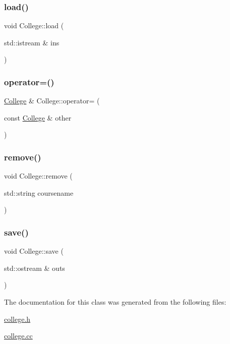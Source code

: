 \hypertarget{class_college_a11422094ddd907705daede7aa537dd73}{}\label{class_college_a11422094ddd907705daede7aa537dd73} 
\subsubsection{\texorpdfstring{load()}{load()}}
{\footnotesize\ttfamily void College\+::load (\begin{DoxyParamCaption}\item[{std\+::istream \&}]{ins }\end{DoxyParamCaption})}

\hypertarget{class_college_af2194c9b37f80d13dc3fdba6784b18e8}{}\label{class_college_af2194c9b37f80d13dc3fdba6784b18e8} 
\subsubsection{\texorpdfstring{operator=()}{operator=()}}
{\footnotesize\ttfamily \hyperlink{class_college}{College} \& College\+::operator= (\begin{DoxyParamCaption}\item[{const \hyperlink{class_college}{College} \&}]{other }\end{DoxyParamCaption})}

\hypertarget{class_college_a4d2ae513b36e6421fb1ca2c08459cfe6}{}\label{class_college_a4d2ae513b36e6421fb1ca2c08459cfe6} 
\subsubsection{\texorpdfstring{remove()}{remove()}}
{\footnotesize\ttfamily void College\+::remove (\begin{DoxyParamCaption}\item[{std\+::string}]{coursename }\end{DoxyParamCaption})}

\hypertarget{class_college_af6b419f813bc990c0e11f99b78a26899}{}\label{class_college_af6b419f813bc990c0e11f99b78a26899} 
\subsubsection{\texorpdfstring{save()}{save()}}
{\footnotesize\ttfamily void College\+::save (\begin{DoxyParamCaption}\item[{std\+::ostream \&}]{outs }\end{DoxyParamCaption})}



The documentation for this class was generated from the following files\+:\begin{DoxyCompactItemize}
\item 
\hyperlink{college_8h}{college.\+h}\item 
\hyperlink{college_8cc}{college.\+cc}\end{DoxyCompactItemize}
